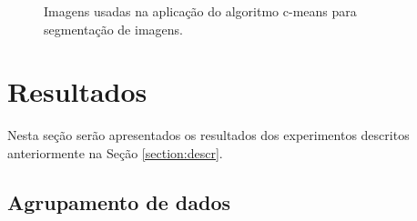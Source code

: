 \documentclass[12pt,a4paper]{article}
\numberwithin{equation}{section}
\begin{document}
\begin{figure}[!htbp]
	\centering
	\caption{Imagens usadas na aplicação do algoritmo c-means para segmentação de imagens.}
	\label{fig:images}
\end{figure}

\section{Resultados} \label{sec:results}

Nesta seção serão apresentados os resultados dos experimentos descritos anteriormente na Seção \ref{section:descr}.

\subsection{Agrupamento de dados}
\end{document}
